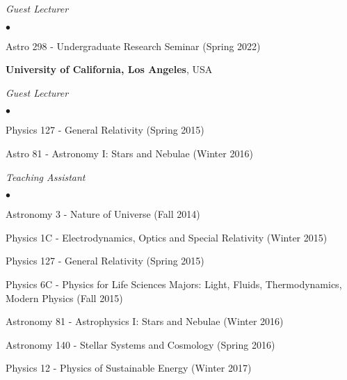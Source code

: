 \documentclass[margin, line]{res}
\newenvironment{list2}{
  \begin{list}{$\bullet$}{%
      \setlength{\itemsep}{0in}
      \setlength{\parsep}{0in} \setlength{\parskip}{0in}
      \setlength{\topsep}{0in} \setlength{\partopsep}{0in} 
      \setlength{\leftmargin}{0.2in}}}{\end{list}}
\begin{document}
\begin{resume}
{\em Guest Lecturer} \hfill {\bf}\\
\begin{list2}

	\item Astro 298 - Undergraduate Research Seminar (Spring 2022)
\end{list2}
	
{\bf University of California, Los Angeles}, USA



{\em Guest Lecturer} \hfill {\bf}\\
\begin{list2}
	\item Physics 127 - General Relativity (Spring 2015)
	\item Astro 81 - Astronomy I: Stars and Nebulae (Winter 2016)
\end{list2}
	
{\em Teaching Assistant} \hfill {}\\
\begin{list2}
	\item Astronomy 3 - Nature of Universe (Fall 2014)
	\item Physics 1C - Electrodynamics, Optics and Special Relativity (Winter 2015)
	\item Physics 127 - General Relativity (Spring 2015)
	\item Physics 6C - Physics for Life Sciences Majors: Light, Fluids, Thermodynamics, Modern Physics (Fall 2015)
	\item Astronomy 81 - Astrophysics I: Stars and Nebulae (Winter 2016)
	\item Astronomy 140 - Stellar Systems and Cosmology (Spring 2016)
	\item Physics 12 - Physics of Sustainable Energy (Winter 2017)
\end{list2}





\end{resume}
\end{document}
